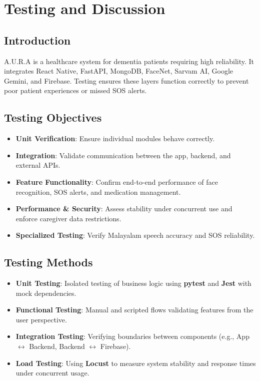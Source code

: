 \chapter{Testing and Discussion}

\section{Introduction}
A.U.R.A is a healthcare system for dementia patients requiring high reliability. It integrates React Native, FastAPI, MongoDB, FaceNet, Sarvam AI, Google Gemini, and Firebase. Testing ensures these layers function correctly to prevent poor patient experiences or missed SOS alerts.

\section{Testing Objectives}
\begin{itemize}
    \item \textbf{Unit Verification}: Ensure individual modules behave correctly.
    \item \textbf{Integration}: Validate communication between the app, backend, and external APIs.
    \item \textbf{Feature Functionality}: Confirm end-to-end performance of face recognition, SOS alerts, and medication management.
    \item \textbf{Performance \& Security}: Assess stability under concurrent use and enforce caregiver data restrictions.
    \item \textbf{Specialized Testing}: Verify Malayalam speech accuracy and SOS reliability.
\end{itemize}

\section{Testing Methods}
\begin{itemize}
    \item \textbf{Unit Testing}: Isolated testing of business logic using \textbf{pytest} and \textbf{Jest} with mock dependencies.
    \item \textbf{Functional Testing}: Manual and scripted flows validating features from the user perspective.
    \item \textbf{Integration Testing}: Verifying boundaries between components (e.g., App $\leftrightarrow$ Backend, Backend $\leftrightarrow$ Firebase).
    \item \textbf{Load Testing}: Using \textbf{Locust} to measure system stability and response times under concurrent usage.
\end{itemize}

